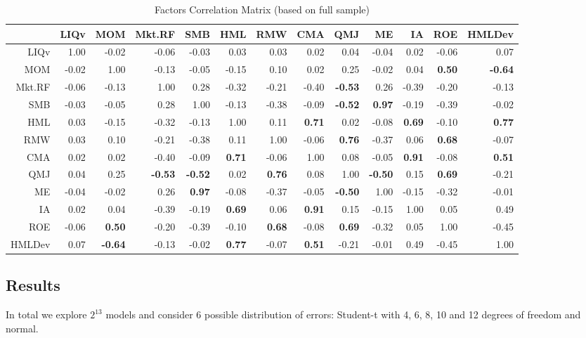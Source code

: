 \documentclass[12pt]{article}
\begin{document}
\begin{table}[ht]
	\scriptsize
	\centering
	\begin{tabular}{rrrrrrrrrrrrr}
		\hline
		& LIQv & MOM & Mkt.RF & SMB & HML & RMW & CMA & QMJ & ME & IA & ROE & HMLDev \\ 
		\hline
		LIQv & 1.00 & -0.02 & -0.06 & -0.03 & 0.03 & 0.03 & 0.02 & 0.04 & -0.04 & 0.02 & -0.06 & 0.07 \\ 
		MOM & -0.02 & 1.00 & -0.13 & -0.05 & -0.15 & 0.10 & 0.02 & 0.25 & -0.02 & 0.04 &\textbf{ 0.50} & \textbf{-0.64} \\ 
		Mkt.RF & -0.06 & -0.13 & 1.00 & 0.28 & -0.32 & -0.21 & -0.40 & \textbf{-0.53} & 0.26 & -0.39 & -0.20 & -0.13 \\ 
		SMB & -0.03 & -0.05 & 0.28 & 1.00 & -0.13 & -0.38 & -0.09 & \textbf{-0.52} & \textbf{0.97} & -0.19 & -0.39 & -0.02 \\ 
		HML & 0.03 & -0.15 & -0.32 & -0.13 & 1.00 & 0.11 & \textbf{0.71} & 0.02 & -0.08 & \textbf{0.69} & -0.10 & \textbf{0.77 }\\ 
		RMW & 0.03 & 0.10 & -0.21 & -0.38 & 0.11 & 1.00 & -0.06 & \textbf{0.76} & -0.37 & 0.06 & \textbf{0.68} & -0.07 \\ 
		CMA & 0.02 & 0.02 & -0.40 & -0.09 & \textbf{0.71} & -0.06 & 1.00 & 0.08 & -0.05 & \textbf{0.91} & -0.08 & \textbf{0.51} \\ 
		QMJ & 0.04 & 0.25 & \textbf{-0.53} & \textbf{-0.52} & 0.02 & \textbf{0.76} & 0.08 & 1.00 & \textbf{-0.50} & 0.15 & \textbf{0.69} & -0.21 \\ 
		ME & -0.04 & -0.02 & 0.26 & \textbf{0.97} & -0.08 & -0.37 & -0.05 & \textbf{-0.50} & 1.00 & -0.15 & -0.32 & -0.01 \\ 
		IA & 0.02 & 0.04 & -0.39 & -0.19 & \textbf{0.69} & 0.06 &\textbf{ 0.91} & 0.15 & -0.15 & 1.00 & 0.05 & 0.49 \\ 
		ROE & -0.06 & \textbf{0.50} & -0.20 & -0.39 & -0.10 & \textbf{0.68} & -0.08 & \textbf{0.69} & -0.32 & 0.05 & 1.00 & -0.45 \\ 
		HMLDev & 0.07 & \textbf{-0.64} & -0.13 & -0.02 & \textbf{0.77} & -0.07 & \textbf{0.51} & -0.21 & -0.01 & 0.49 & -0.45 & 1.00 \\ 
		\hline
	\end{tabular}
	\caption{Factors Correlation Matrix (based on full sample)}
\end{table}
\subsection{Results}
In total we explore $2^{13}$ models and consider 6 possible distribution of errors: Student-t with 4, 6, 8, 10 and 12 degrees of freedom and normal. 
\end{document}
